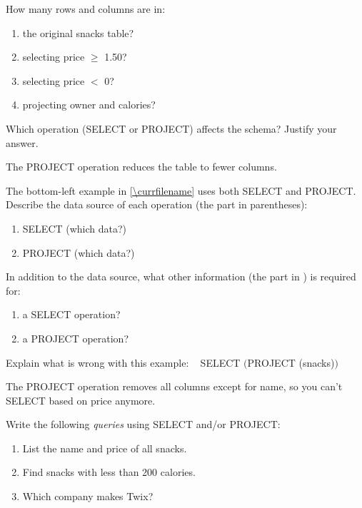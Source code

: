 

\Q How many rows and columns are in:

\begin{enumerate}[itemsep=1ex]
\item the original snacks table? 
\item selecting price $\geq$ 1.50? 
\item selecting price $<$ 0? 
\item projecting owner and calories? 
\end{enumerate}


\Q Which operation (SELECT or PROJECT) affects the schema? Justify your answer.

\begin{answer}
The PROJECT operation reduces the table to fewer columns.
\end{answer}


\Q The bottom-left example in \ref{\currfilename} uses both SELECT and PROJECT.
Describe the data source of each operation (the part in parentheses):

\begin{enumerate}[itemsep=1ex]
\item SELECT \sub{\ldots} (which data?) 
\item PROJECT \sub{\ldots} (which data?) 
\end{enumerate}


\Q In addition to the data source, what other information (the part in ) is required for:

\begin{enumerate}[itemsep=1ex]
\item a SELECT operation?  
\item a PROJECT operation? 
\end{enumerate}


\Q Explain what is wrong with this example: ~ SELECT  $\big($PROJECT  (snacks)$\big)$

\begin{answer}
The PROJECT operation removes all columns except for name, so you can't SELECT based on price anymore.
\end{answer}


\Q Write the following \emph{queries} using SELECT and/or PROJECT:

\begin{enumerate}
\item List the name and price of all snacks.

\item Find snacks with less than 200 calories.

\item Which company makes Twix?
\end{enumerate}
